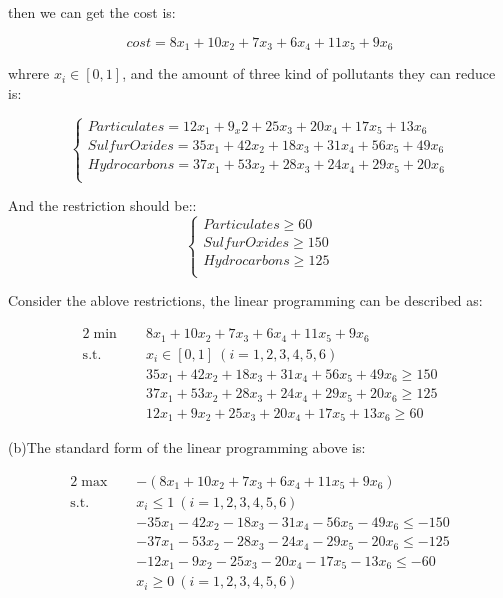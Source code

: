 \documentclass[12pt,a4paper]{article}
\theoremstyle{definition}
\begin{document}
\begin{enumerate}
	then we can get the cost is:

	\begin{equation*}
    cost  = 8x_1 + 10x_2 + 7x_3 + 6x_4 + 11x_5 + 9x_6
	\end{equation*}

	whrere $x_i \in [0, 1]$, and the amount of three kind of pollutants they can reduce is:
	
	\begin{equation*}
		\left\{
		\begin{array}{lcl}
			Particulates = 12x_1 + 9_x2 + 25x_3 + 20x_4 + 17x_5 + 13x_6 \\
			SulfurOxides = 35x_1 +  42x_2 + 18x_3  + 31x_4  + 56x_5 + 49x_6 \\
			Hydrocarbons =  37x_1  + 53x_2  + 28x_3 + 24x_4 + 29x_5 + 20x_6 \\
		\end{array} \right.
		\end{equation*}


	And the restriction should be::
	\begin{equation*}
		\left\{
		\begin{array}{lcl}
			Particulates \geq 60 \\
			SulfurOxides \geq 150 \\
			Hydrocarbons \geq 125 \\
		\end{array} \right.
		\end{equation*}

	Consider the ablove restrictions, the linear programming can be described as:
	
	\begin{alignat*}{2}
		\min\quad & 8x_1 + 10x_2 + 7x_3 + 6x_4 + 11x_5 + 9x_6\\
		\mbox{s.t.}\quad
		& x_i \in [0, 1] ~ (i = 1, 2, 3, 4, 5, 6)\\		
		& 35x_1 +  42x_2 + 18x_3  + 31x_4  + 56x_5 + 49x_6 \geq 150 \\
		& 37x_1  + 53x_2  + 28x_3 + 24x_4 + 29x_5 + 20x_6 \geq 125  \\
		& 12x_1 + 9x_2 + 25x_3 + 20x_4 + 17x_5 + 13x_6 \geq 60
		\end{alignat*}
    
   
	(b)The standard form of the linear programming above is:

	\begin{alignat*}{2}
		\max\quad & -(8x_1 + 10x_2 + 7x_3 + 6x_4 + 11x_5 + 9x_6)\\
		\mbox{s.t.}\quad
		& x_i  \leq 1 ~ (i = 1, 2, 3, 4, 5, 6)\\
		& -35x_1 -  42x_2 - 18x_3  - 31x_4  - 56x_5 - 49x_6 \leq -150\\
		&  - 37x_1  - 53x_2  - 28x_3 - 24x_4 - 29x_5 - 20x_6 \leq -125\\
		& -12x_1 - 9x_2  - 25x_3 - 20x_4 - 17x_5 - 13x_6 \leq -60 \\
		& x_i \geq 0 ~ (i = 1, 2, 3, 4, 5, 6)	\\
		\end{alignat*}
    

\end{enumerate}
\end{document}
